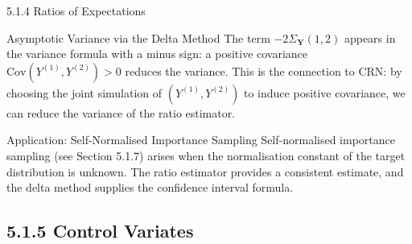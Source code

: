 \documentclass[aspectratio=169,10pt]{beamer}
\begin{document}
\begin{frame}[allowframebreaks]{5.1.4 Ratios of Expectations}
\begin{block}{Asymptotic Variance via the Delta Method}
  The term $-2\Sigma_{\mathbf{Y}}(1,2)$ appears in the variance formula with a
  minus sign: a positive covariance $\mathrm{Cov}(Y^{(1)}, Y^{(2)}) > 0$
  reduces the variance.  This is the connection to CRN: by choosing the joint
  simulation of $(Y^{(1)}, Y^{(2)})$ to induce positive covariance,
  we can reduce the variance of the ratio estimator.
\end{block}

\begin{alertblock}{Application: Self-Normalised Importance Sampling}
  Self-normalised importance sampling (see Section 5.1.7) arises when the
  normalisation constant of the target distribution is unknown.  The ratio
  estimator provides a consistent estimate, and the delta method supplies
  the confidence interval formula.
\end{alertblock}

\end{frame}

\subsection{5.1.5 Control Variates}
\end{document}
